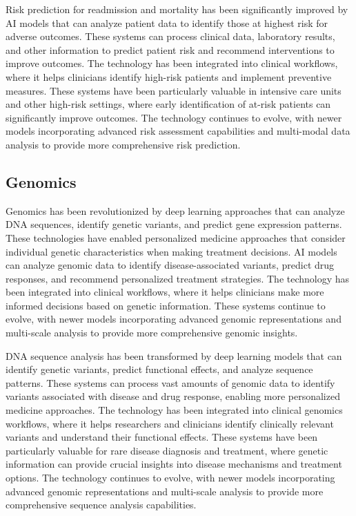 Risk prediction for readmission and mortality has been significantly improved by AI models that can analyze patient data to identify those at highest risk for adverse outcomes. These systems can process clinical data, laboratory results, and other information to predict patient risk and recommend interventions to improve outcomes. The technology has been integrated into clinical workflows, where it helps clinicians identify high-risk patients and implement preventive measures. These systems have been particularly valuable in intensive care units and other high-risk settings, where early identification of at-risk patients can significantly improve outcomes. The technology continues to evolve, with newer models incorporating advanced risk assessment capabilities and multi-modal data analysis to provide more comprehensive risk prediction.

\subsection{Genomics}

Genomics has been revolutionized by deep learning approaches that can analyze DNA sequences, identify genetic variants, and predict gene expression patterns. These technologies have enabled personalized medicine approaches that consider individual genetic characteristics when making treatment decisions. AI models can analyze genomic data to identify disease-associated variants, predict drug responses, and recommend personalized treatment strategies. The technology has been integrated into clinical workflows, where it helps clinicians make more informed decisions based on genetic information. These systems continue to evolve, with newer models incorporating advanced genomic representations and multi-scale analysis to provide more comprehensive genomic insights.

DNA sequence analysis has been transformed by deep learning models that can identify genetic variants, predict functional effects, and analyze sequence patterns. These systems can process vast amounts of genomic data to identify variants associated with disease and drug response, enabling more personalized medicine approaches. The technology has been integrated into clinical genomics workflows, where it helps researchers and clinicians identify clinically relevant variants and understand their functional effects. These systems have been particularly valuable for rare disease diagnosis and treatment, where genetic information can provide crucial insights into disease mechanisms and treatment options. The technology continues to evolve, with newer models incorporating advanced genomic representations and multi-scale analysis to provide more comprehensive sequence analysis capabilities.

